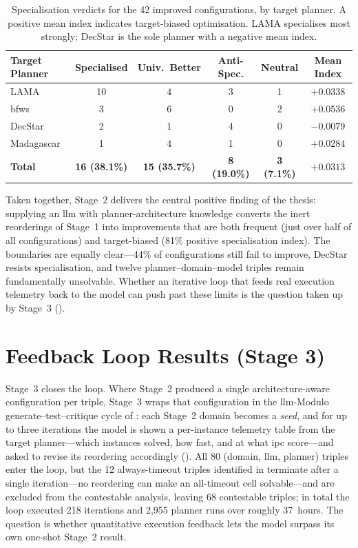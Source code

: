 \begin{table}[htbp]
  \centering
  \caption{Specialisation verdicts for the 42 improved configurations, by target planner. A positive mean index indicates target-biased optimisation. LAMA specialises most strongly; DecStar is the sole planner with a negative mean index.}
  \label{tab:s2_specialisation}
  \small
  \begin{tabular}{l c c c c c}
    \toprule
    \textbf{Target Planner} & \textbf{Specialised} & \textbf{Univ.\ Better} & \textbf{Anti-Spec.} & \textbf{Neutral} & \textbf{Mean Index} \\
    \midrule
    LAMA  & 10 & 4 & 3 & 1 & $+0.0338$ \\
    \gls{bfws}  & 3  & 6 & 0 & 2 & $+0.0536$ \\
    DecStar     & 2  & 1 & 4 & 0 & $-0.0079$ \\
    Madagascar  & 1  & 4 & 1 & 0 & $+0.0284$ \\
    \midrule
    \textbf{Total} & \textbf{16 (38.1\%)} & \textbf{15 (35.7\%)} & \textbf{8 (19.0\%)} & \textbf{3 (7.1\%)} & \textbf{$+0.0313$} \\
    \bottomrule
  \end{tabular}
\end{table}

Taken together, Stage~2 delivers the central positive finding of the thesis: supplying an \gls{llm} with planner-architecture knowledge converts the inert reorderings of Stage~1 into improvements that are both frequent (just over half of all configurations) and target-biased (81\% positive specialisation index). The boundaries are equally clear---44\% of configurations still fail to improve, DecStar resists specialisation, and twelve planner--domain--model triples remain fundamentally unsolvable. Whether an iterative loop that feeds real execution telemetry back to the model can push past these limits is the question taken up by Stage~3 ().

\section{Feedback Loop Results (Stage 3)}
\label{sec:results:stage3}

Stage~3 closes the loop. Where Stage~2 produced a single architecture-aware configuration per triple, Stage~3 wraps that configuration in the \gls{llm}-Modulo generate--test--critique cycle of : each Stage~2 domain becomes a \emph{seed}, and for up to three iterations the model is shown a per-instance telemetry table from the target planner---which instances solved, how fast, and at what \gls{ipc} score---and asked to revise its reordering accordingly (). All 80 (domain, \gls{llm}, planner) triples enter the loop, but the 12 always-timeout triples identified in  terminate after a single iteration---no reordering can make an all-timeout cell solvable---and are excluded from the contestable analysis, leaving 68 contestable triples; in total the loop executed 218 iterations and 2{,}955 planner runs over roughly 37~hours. The question is whether quantitative execution feedback lets the model surpass its own one-shot Stage~2 result.

